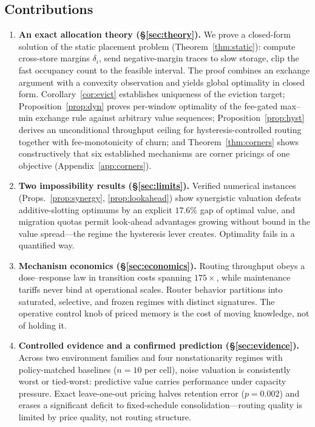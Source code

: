 \documentclass[10pt,twocolumn]{article}
\theoremstyle{definition}
\begin{document}
\subsection{Contributions}
\begin{enumerate}\setlength{\itemsep}{1pt}
\item \textbf{An exact allocation theory (\S\ref{sec:theory}).} We prove a closed-form solution of the static
placement problem (Theorem~\ref{thm:static}): compute cross-store margins $\delta_i$, send negative-margin
traces to slow storage, clip the fast occupancy count to the feasible interval. The proof combines an
exchange argument with a convexity observation and yields global optimality in closed form.
Corollary~\ref{cor:evict} establishes uniqueness of the eviction target; Proposition~\ref{prop:dyn} proves
per-window optimality of the fee-gated max--min exchange rule against arbitrary value sequences;
Proposition~\ref{prop:hyst} derives an unconditional throughput ceiling for hysteresis-controlled routing
together with fee-monotonicity of churn; and Theorem~\ref{thm:corners} shows constructively that six
established mechanisms are corner pricings of one objective (Appendix~\ref{app:corners}).
\item \textbf{Two impossibility results (\S\ref{sec:limits}).} Verified numerical instances
(Props.~\ref{prop:synergy}, \ref{prop:lookahead}) show synergistic valuation defeats additive-slotting
optimums by an explicit $17.6\%$ gap of optimal value, and migration quotas permit look-ahead advantages growing without bound
in the value spread---the regime the hysteresis lever creates. Optimality fails in a quantified way.
\item \textbf{Mechanism economics (\S\ref{sec:economics}).} Routing throughput obeys a dose--response law in
transition costs spanning $175\times$, while maintenance tariffs never bind at operational scales. Router
behavior partitions into saturated, selective, and frozen regimes with distinct signatures. The operative
control knob of priced memory is the cost of moving knowledge, not of holding it.
\item \textbf{Controlled evidence and a confirmed prediction (\S\ref{sec:evidence}).} Across two environment
families and four nonstationarity regimes with policy-matched baselines ($n{=}10$ per cell), noise valuation
is consistently worst or tied-worst: predictive value carries performance under capacity pressure. Exact
leave-one-out pricing halves retention error ($p=0.002$) and erases a significant deficit to fixed-schedule
consolidation---routing quality is limited by price quality, not routing structure.

\end{enumerate}
\end{document}
